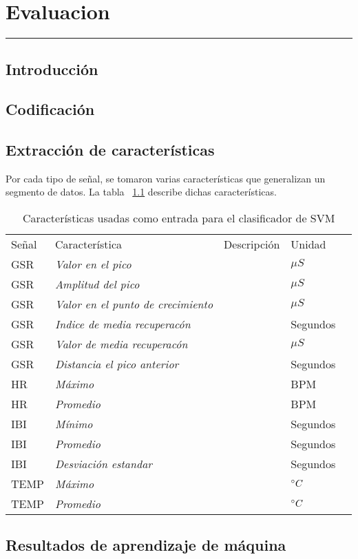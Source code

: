 
\chapter{Evaluacion}\label{capit:cap4}
\vspace{-2.0325ex}%
\noindent
\rule{\textwidth}{0.5pt}
\vspace{-5.5ex}%
\newcommand{\pushline}{\Indp}%

\section{Introducci\'on}\label{cap4:intro}

\section{Codificaci\'on}

\section{Extracci\'on de caracter\'isticas}
Por cada tipo de se\~nal, se tomaron varias caracter\'isticas que generalizan un segmento de datos. La tabla ~\ref{tab:features} describe dichas caracter\'isticas.


\begin{table}[h]
	\centering
	\caption{Caracter\'isticas usadas como entrada para el clasificador de SVM}
	\label{tab:features}
	\begin{tabular}{|l|l|l|l|l|}
		Se\~nal & Caracter\'istica & Descripci\'on & Unidad \\
		GSR&\textit{Valor en el pico}                &             &	$\mu S$ \\
		GSR   &\textit{Amplitud del pico}                &             &$\mu S$ 	\\
		GSR   &\textit{Valor en el punto de crecimiento}                &             &$\mu S$	 \\
		GSR   &\textit{Indice de media recuperac\'on}                &             &Segundos	 \\
		GSR   &\textit{Valor de media recuperac\'on}                &             &$\mu S$	 \\
		GSR   &\textit{Distancia el pico anterior}                &             &Segundos	 \\
		HR   &\textit{M\'aximo}                &             &BPM	 \\
		HR   &\textit{Promedio}                &             &BPM	 \\
		IBI   &\textit{M\'inimo}                &             &Segundos	 \\
		IBI   &\textit{Promedio}                &             &Segundos	 \\
		IBI   &\textit{Desviaci\'on estandar}                &             &Segundos	 \\
		TEMP   &\textit{M\'aximo}                &             &${}^{\circ} C$	 \\
		TEMP   &\textit{Promedio}                &             &${}^{\circ} C$ \\

		
	\end{tabular}
\end{table}
\section{Resultados de aprendizaje de m\'aquina}
\newpage
